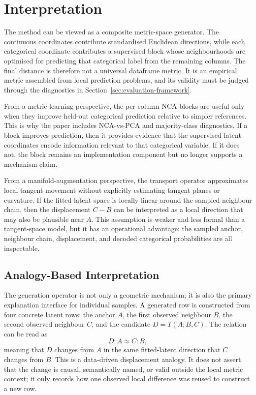 \section{Interpretation}
\label{sec:interpretation}

The method can be viewed as a composite metric-space generator. The continuous
coordinates contribute standardised Euclidean directions, while each
categorical coordinate contributes a supervised block whose neighbourhoods are
optimised for predicting that categorical label from the remaining columns.
The final distance is therefore not a universal dataframe metric. It is an
empirical metric assembled from local prediction problems, and its validity
must be judged through the diagnostics in Section~\ref{sec:evaluation-framework}.

From a metric-learning perspective, the per-column NCA blocks are useful only
when they improve held-out categorical prediction relative to simpler
references. This is why the paper includes NCA-vs-PCA and majority-class
diagnostics. If a block improves prediction, then it provides evidence that the
supervised latent coordinates encode information relevant to that categorical
variable. If it does not, the block remains an implementation component but no
longer supports a mechanism claim.

From a manifold-augmentation perspective, the transport operator approximates
local tangent movement without explicitly estimating tangent planes or
curvature. If the fitted latent space is locally linear around the sampled
neighbour chain, then the displacement $C-B$ can be interpreted as a local
direction that may also be plausible near $A$. This assumption is weaker and
less formal than a tangent-space model, but it has an operational advantage:
the sampled anchor, neighbour chain, displacement, and decoded categorical
probabilities are all inspectable.

\subsection{Analogy-Based Interpretation}

The generation operator is not only a geometric mechanism; it is also the
primary explanation interface for individual samples. A generated row is
constructed from four concrete latent rows: the anchor $A$, the first observed
neighbour $B$, the second observed neighbour $C$, and the candidate
$D=T(A;B,C)$. The relation can be read as
\[
  D : A \approx C : B,
\]
meaning that $D$ changes from $A$ in the same fitted-latent direction that
$C$ changes from $B$. This is a data-driven displacement analogy. It does not
assert that the change is causal, semantically named, or valid outside the
local metric context; it only records how one observed local difference was
reused to construct a new row.

